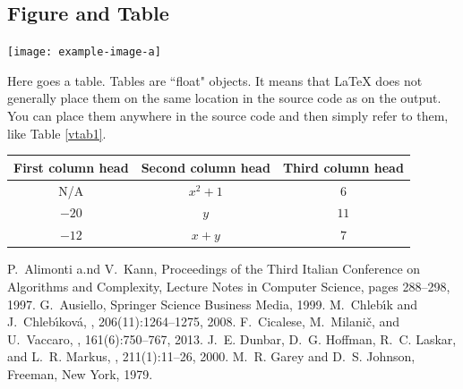 \documentclass[a0,portrait]{a0poster}
\theoremstyle{definition}
\theoremstyle{plain}
\theoremstyle{definition}
\begin{document}
\begin{multicols}{2}
\section{Figure and Table}
\begin{center}\vspace{1cm}
\texttt{[image: example-image-a]}
\label{vfig1}
\end{center}\vspace{1cm}


Here goes a table. Tables are ``float" objects.  It means that \LaTeX{} does not generally
place them on the same location in the source code as on the output. You can place them 
anywhere in the source code and then simply refer to them, like Table \ref{vtab1}.

\begin{center}\vspace{1cm}
\begin{tabular}{ccc}
\hline
First column head & Second column head & Third column head \\ \hline
N/A & $x^2+1$ & $6$ \\ 
$-20$ & $y$ & $11$ \\ 
$-12$ & $x+y$ & $7$\\
\hline
\end{tabular} 
\label{vtab1}
\end{center}


\begin{thebibliography}{9}
P.~Alimonti a.nd V.~Kann,
\newblock Proceedings of the Third Italian Conference on Algorithms and Complexity, { Lecture Notes in Computer  Science}, pages 288--298, 1997.
G.~Ausiello,
\newblock Springer Science Business Media, 1999.
M.~Chleb{\'\i}k and J.~Chleb{\'\i}kov{\'a},
, 206(11):1264--1275, 2008.
F.~Cicalese, M.~Milani{\v{c}}, and U.~Vaccaro,
, 161(6):750--767, 2013.
J.~E. Dunbar, D.~G. Hoffman, R.~C. Laskar, and L.~R. Markus,
, 211(1):11--26, 2000.
M.~R. Garey and D.~S. Johnson,
\newblock Freeman, New York, 1979.
\end{thebibliography}

\end{multicols}
\end{document}
